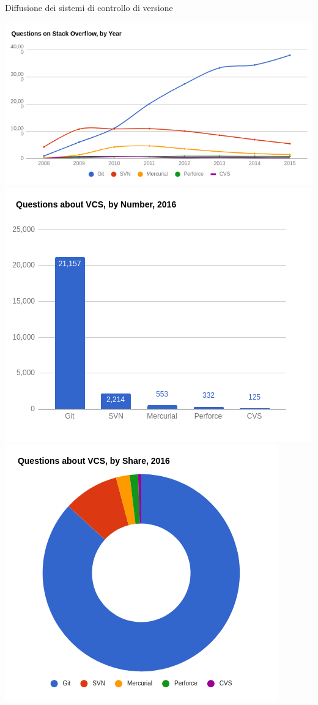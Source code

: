 \documentclass[xcolor=dvipsnames,presentation]{beamer}
\begin{document}
\begin{frame}[allowframebreaks]{Diffusione dei sistemi di controllo di versione}
\begin{center}
        \includegraphics[width=\textwidth, height=.77\textheight, keepaspectratio]{img/questions}\\
        \includegraphics[width=\textwidth, height=.77\textheight,keepaspectratio]{img/questionsbynum} \\
        \includegraphics[width=\textwidth, height=.77\textheight,keepaspectratio]{img/questionsbyshare} \\

\end{center}
\end{frame}
\end{document}
